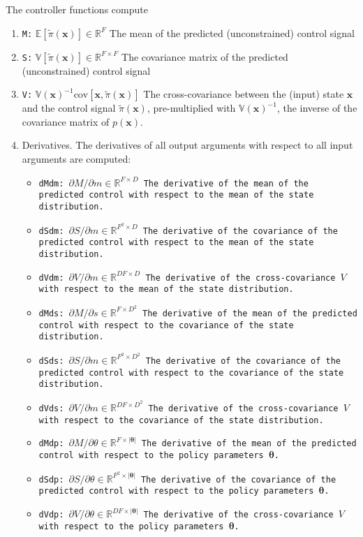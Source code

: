 \documentclass{article}
\renewcommand{\vec}[1]{\boldsymbol{#1}}  %
\newcommand{\inv}{^{-1}}
\newcommand{\E}{\mathds{E}}
\newcommand{\var}{\mathds{V}}
\newcommand{\cov}{\mathrm{cov}}
\newcommand{\R}{\mathds{R}}
\newcommand{\polpar}{\theta}
\begin{document}
The controller functions compute
\begin{enumerate}
\item \texttt{M:} $\E[\tilde\pi(\vec x)]\in\R^F$ The mean of the
  predicted (unconstrained) control signal
\item \texttt{S:} $\var[\tilde\pi(\vec x)]\in\R^{F\times F}$ The
  covariance matrix of the predicted (unconstrained) control signal
\item \texttt{V:} $\var(\vec x)\inv\cov[\vec x,\tilde\pi(\vec x)]$ The
  cross-covariance between the (input) state $\vec x$ and the control
  signal $\tilde\pi(\vec x)$, pre-multiplied with $\var(\vec x)\inv$,
  the inverse of the covariance matrix of $p(\vec x)$.
\item Derivatives. The derivatives of all output arguments with
  respect to all input arguments are computed:
\begin{itemize}
\item \tt{dMdm:} $\partial M/\partial m\in\R^{F\times D}$ The
  derivative of the mean of the predicted control with respect to the
  mean of the state distribution.
\item \tt{dSdm:} $\partial S/\partial m\in\R^{F^2\times D}$ The
  derivative of the covariance of the predicted control with respect to the
  mean of the state distribution.
\item \tt{dVdm:} $\partial V/\partial m\in\R^{DF\times D}$ The
  derivative of the cross-covariance $V$ with respect to the
  mean of the state distribution.
\item \tt{dMds:} $\partial M/\partial s\in\R^{F\times D^2}$ The
  derivative of the mean of the predicted control with respect to the
  covariance of the state distribution.
\item \tt{dSds:} $\partial S/\partial m\in\R^{F^2\times D^2}$ The
  derivative of the covariance of the predicted control with respect to the
  covariance of the state distribution.
\item \tt{dVds:} $\partial V/\partial m\in\R^{DF\times D^2}$ The
  derivative of the cross-covariance $V$ with respect to the
  covariance of the state distribution.
\item \tt{dMdp:} $\partial M/\partial\polpar\in\R^{F\times |\vec\polpar|}$ The
  derivative of the mean of the predicted control with respect to the
  policy parameters $\vec\polpar$.
\item \tt{dSdp:} $\partial S/\partial\polpar\in\R^{F^2\times |\vec\polpar|}$ The
  derivative of the covariance of the predicted control with respect to the
  policy parameters $\vec\polpar$.
\item \tt{dVdp:} $\partial V/\partial\polpar\in\R^{DF\times |\vec\polpar|}$ The
  derivative of the cross-covariance $V$ with respect to the
  policy parameters $\vec\polpar$.
\end{itemize}
\end{enumerate}
\end{document}
